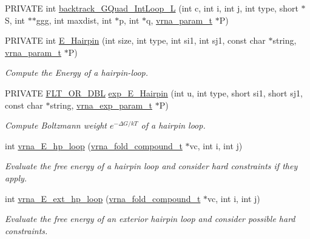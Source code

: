\begin{DoxyCompactItemize}
\item 
P\+R\+I\+V\+A\+TE int \hyperlink{group__loops_ga7b371308fa5a45c7ac353ef6ed1014de}{backtrack\+\_\+\+G\+Quad\+\_\+\+Int\+Loop\+\_\+L} (int c, int i, int j, int type, short $\ast$S, int $\ast$$\ast$ggg, int maxdist, int $\ast$p, int $\ast$q, \hyperlink{group__energy__parameters_ga8a69ca7d787e4fd6079914f5343a1f35}{vrna\+\_\+param\+\_\+t} $\ast$P)
\item 
P\+R\+I\+V\+A\+TE int \hyperlink{group__loops_gadf943ee9a45b7f4cee9192c06210dace}{E\+\_\+\+Hairpin} (int size, int type, int si1, int sj1, const char $\ast$string, \hyperlink{group__energy__parameters_ga8a69ca7d787e4fd6079914f5343a1f35}{vrna\+\_\+param\+\_\+t} $\ast$P)
\begin{DoxyCompactList}\small\item\em Compute the Energy of a hairpin-\/loop. \end{DoxyCompactList}\item 
P\+R\+I\+V\+A\+TE \hyperlink{group__data__structures_ga31125aeace516926bf7f251f759b6126}{F\+L\+T\+\_\+\+O\+R\+\_\+\+D\+BL} \hyperlink{group__loops_ga51fb555974f180b78d76142b2894851c}{exp\+\_\+\+E\+\_\+\+Hairpin} (int u, int type, short si1, short sj1, const char $\ast$string, \hyperlink{group__energy__parameters_ga01d8b92fe734df8d79a6169482c7d8d8}{vrna\+\_\+exp\+\_\+param\+\_\+t} $\ast$P)
\begin{DoxyCompactList}\small\item\em Compute Boltzmann weight $e^{-\Delta G/kT} $ of a hairpin loop. \end{DoxyCompactList}\item 
int \hyperlink{group__loops_ga999ba163a8148d72fd5f22819a681df7}{vrna\+\_\+\+E\+\_\+hp\+\_\+loop} (\hyperlink{group__fold__compound_ga1b0cef17fd40466cef5968eaeeff6166}{vrna\+\_\+fold\+\_\+compound\+\_\+t} $\ast$vc, int i, int j)
\begin{DoxyCompactList}\small\item\em Evaluate the free energy of a hairpin loop and consider hard constraints if they apply. \end{DoxyCompactList}\item 
int \hyperlink{group__loops_gac3393ee309372eccae944e3a07f455f9}{vrna\+\_\+\+E\+\_\+ext\+\_\+hp\+\_\+loop} (\hyperlink{group__fold__compound_ga1b0cef17fd40466cef5968eaeeff6166}{vrna\+\_\+fold\+\_\+compound\+\_\+t} $\ast$vc, int i, int j)
\begin{DoxyCompactList}\small\item\em Evaluate the free energy of an exterior hairpin loop and consider possible hard constraints. \end{DoxyCompactList}\item 
$$
\end{DoxyCompactItemize}
